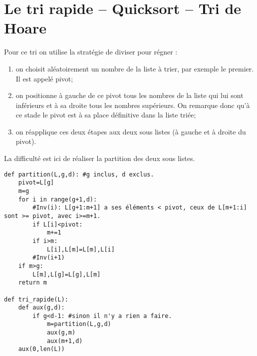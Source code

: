 \section{Le tri rapide -- Quicksort -- Tri de Hoare}
Pour ce tri on utilise la stratégie de diviser pour régner : 
\begin{enumerate}
\item on choisit aléatoirement un nombre de la liste à trier, par exemple le premier. Il est appelé pivot;
\item on positionne à gauche de ce pivot tous les nombres de la liste qui lui sont inférieurs et à sa droite tous les nombres supérieurs. On remarque donc qu'à ce stade le pivot est à sa place définitive dans la liste triée;
\item on réapplique ces deux étapes aux deux sous listes (à gauche et à droite du pivot). 
\end{enumerate}

La difficulté est ici de réaliser la partition des deux sous listes. 
\begin{lstlisting}	
def partition(L,g,d): #g inclus, d exclus.
    pivot=L[g]
    m=g
    for i in range(g+1,d):
        #Inv(i): L[g+1:m+1] a ses éléments < pivot, ceux de L[m+1:i] sont >= pivot, avec i>=m+1.
        if L[i]<pivot:
            m+=1
        if i>m:
            L[i],L[m]=L[m],L[i]
        #Inv(i+1)
    if m>g:
        L[m],L[g]=L[g],L[m]
    return m

def tri_rapide(L):
    def aux(g,d):
        if g<d-1: #sinon il n'y a rien a faire.
            m=partition(L,g,d)
            aux(g,m)
            aux(m+1,d)
    aux(0,len(L))
\end{lstlisting}	


